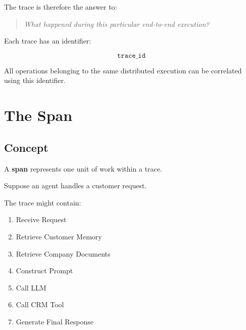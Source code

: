 \documentclass[11pt,a4paper]{article}
\begin{document}
\begin{center}
\end{center}

The trace is therefore the answer to:

\begin{quote}
\textit{What happened during this particular end-to-end execution?}
\end{quote}

Each trace has an identifier:

\[
\texttt{trace\_id}
\]

All operations belonging to the same distributed execution can be correlated using this identifier.

\section{The Span}

\subsection{Concept}

A \textbf{span} represents one unit of work within a trace.

Suppose an agent handles a customer request.

The trace might contain:

\begin{enumerate}
\item Receive Request
\item Retrieve Customer Memory
\item Retrieve Company Documents
\item Construct Prompt
\item Call LLM
\item Call CRM Tool
\item Generate Final Response
\end{enumerate}
\end{document}
